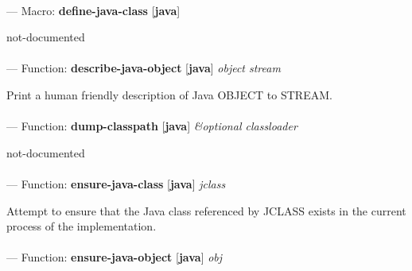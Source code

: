 \paragraph{}
\label{JAVA:DEFINE-JAVA-CLASS}
--- Macro: \textbf{define-java-class} [\textbf{java}] \textit{}

\begin{adjustwidth}{5em}{5em}
not-documented
\end{adjustwidth}

\paragraph{}
\label{JAVA:DESCRIBE-JAVA-OBJECT}
--- Function: \textbf{describe-java-object} [\textbf{java}] \textit{object stream}

\begin{adjustwidth}{5em}{5em}
Print a human friendly description of Java OBJECT to STREAM.
\end{adjustwidth}

\paragraph{}
\label{JAVA:DUMP-CLASSPATH}
--- Function: \textbf{dump-classpath} [\textbf{java}] \textit{\&optional classloader}

\begin{adjustwidth}{5em}{5em}
not-documented
\end{adjustwidth}

\paragraph{}
\label{JAVA:ENSURE-JAVA-CLASS}
--- Function: \textbf{ensure-java-class} [\textbf{java}] \textit{jclass}

\begin{adjustwidth}{5em}{5em}
Attempt to ensure that the Java class referenced by JCLASS exists in the current process of the implementation.
\end{adjustwidth}

\paragraph{}
\label{JAVA:ENSURE-JAVA-OBJECT}
--- Function: \textbf{ensure-java-object} [\textbf{java}] \textit{obj}

